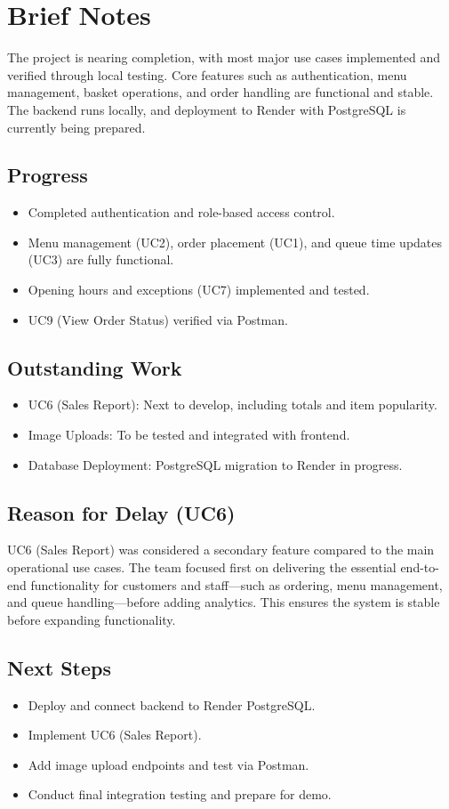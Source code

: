 \documentclass{article}
\begin{document}
\section*{Brief Notes}

The project is nearing completion, with most major use cases implemented and verified through local testing. Core features such as authentication, menu management, basket operations, and order handling are functional and stable. The backend runs locally, and deployment to Render with PostgreSQL is currently being prepared.

\subsection*{Progress}
\begin{itemize}
    \item Completed authentication and role-based access control.
    \item Menu management (UC2), order placement (UC1), and queue time updates (UC3) are fully functional.
    \item Opening hours and exceptions (UC7) implemented and tested.
    \item UC9 (View Order Status) verified via Postman.
\end{itemize}

\subsection*{Outstanding Work}
\begin{itemize}
    \item UC6 (Sales Report): Next to develop, including totals and item popularity.
    \item Image Uploads: To be tested and integrated with frontend.
    \item Database Deployment: PostgreSQL migration to Render in progress.
\end{itemize}

\subsection*{Reason for Delay (UC6)}
UC6 (Sales Report) was considered a secondary feature compared to the main operational use cases. The team focused first on delivering the essential end-to-end functionality for customers and staff—such as ordering, menu management, and queue handling—before adding analytics. This ensures the system is stable before expanding functionality.

\subsection*{Next Steps}
\begin{itemize}
    \item Deploy and connect backend to Render PostgreSQL.
    \item Implement UC6 (Sales Report).
    \item Add image upload endpoints and test via Postman.
    \item Conduct final integration testing and prepare for demo.
\end{itemize}
\end{document}
